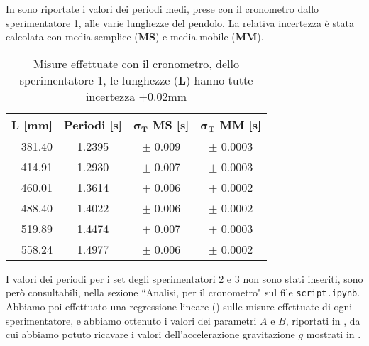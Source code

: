 In  sono riportate i valori dei periodi medi, prese con il cronometro dallo sperimentatore 1, alle varie lunghezze del pendolo. La relativa incertezza è stata calcolata con media semplice (\textbf{MS}) e media mobile (\textbf{MM}).\\
\begin{table}[h]
    \centering
    \begin{tabular}{r|c|c|c}
        \textbf{L} [mm] & \textbf{Periodi} [s]& $\mathbf{\sigma_{T}}$\textbf{ MS} [s] & $\mathbf{\sigma_{T}}$\textbf{ MM} [s] \\
        \hline
        381.40 & 1.2395 & $\pm$ 0.009& $\pm$ 0.0003 \\
        414.91 & 1.2930 & $\pm$ 0.007& $\pm$ 0.0003 \\
        460.01 & 1.3614 & $\pm$ 0.006& $\pm$ 0.0002 \\
        488.40  & 1.4022 & $\pm$ 0.006& $\pm$ 0.0002 \\
        519.89  & 1.4474 & $\pm$ 0.007& $\pm$ 0.0003 \\
        558.24  & 1.4977 & $\pm$ 0.006& $\pm$ 0.0002 \\
    \end{tabular}
    \caption{Misure effettuate con il cronometro, dello sperimentatore 1, le lunghezze (\textbf{L}) hanno tutte incertezza $\pm$0.02mm}
    \label{tab:misure cronometro mattia}
\end{table}

I valori dei periodi per i set degli sperimentatori 2 e 3 non sono stati inseriti, sono però consultabili, nella sezione ``Analisi, per il cronometro" sul file \verb|script.ipynb|.\\

Abbiamo poi effettuato una regressione lineare () sulle misure effettuate di ogni sperimentatore, e abbiamo ottenuto i valori dei parametri $A$ e $B$, riportati in , da cui abbiamo potuto ricavare i valori dell'accelerazione gravitazione $g$ mostrati in .\\

